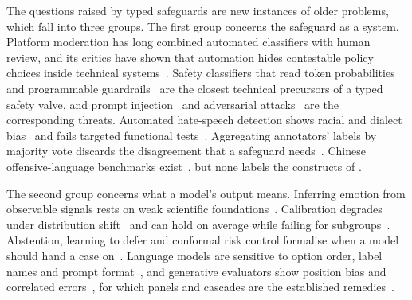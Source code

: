 The questions raised by typed safeguards are new instances of older problems, which fall into three groups.
The first group concerns the safeguard as a system.
Platform moderation has long combined automated classifiers with human review, and its critics have shown that automation hides contestable policy choices inside technical systems~\cite{gorwa2020algorithmic,gillespie2018custodians}.
Safety classifiers that read token probabilities~\cite{inan2023llama,markov2023holistic,sharma2025constitutional} and programmable guardrails~\cite{rebedea2023nemo} are the closest technical precursors of a typed safety valve, and prompt injection~\cite{perez2022ignore,greshake2023not} and adversarial attacks~\cite{zou2023universal,toyer2024tensor} are the corresponding threats.
Automated hate-speech detection shows racial and dialect bias~\cite{sap2019risk,davidson2019racial} and fails targeted functional tests~\cite{rottger2021hatecheck}.
Aggregating annotators' labels by majority vote discards the disagreement that a safeguard needs~\cite{davani2022dealing,plank2022problem}.
Chinese offensive-language benchmarks exist~\cite{deng2022cold,lu2023toxicn}, but none labels the constructs of \pol{}.

The second group concerns what a model's output means.
Inferring emotion from observable signals rests on weak scientific foundations~\cite{barrett2019emotional,stark2021ethics}.
Calibration degrades under distribution shift~\cite{guo2017calibration,ovadia2019trust} and can hold on average while failing for subgroups~\cite{hebertjohnson2018multicalibration}.
Abstention, learning to defer and conformal risk control formalise when a model should hand a case on~\cite{chow1970optimum,geifman2017selective,madras2018predict,angelopoulos2024conformal}.
Language models are sensitive to option order, label names and prompt format~\cite{zhao2021calibrate,pezeshkpour2024large,sclar2024quantifying}, and generative evaluators show position bias and correlated errors~\cite{wang2024fair,goel2025great}, for which panels and cascades are the established remedies~\cite{verga2024replacing,chen2023frugalgpt}.

